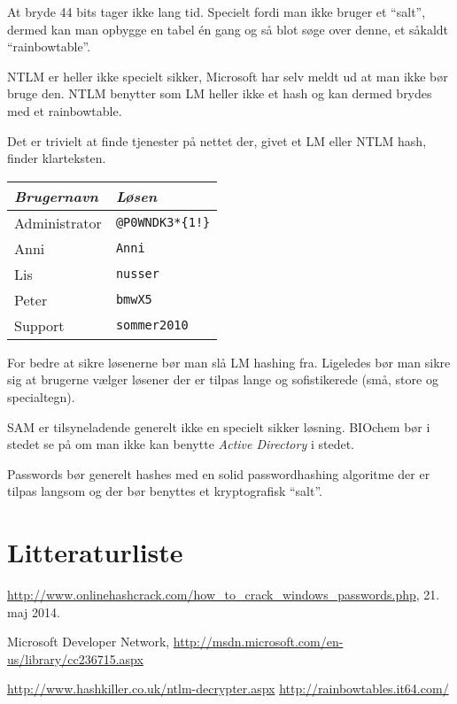 \documentclass[10pt,a4paper,danish]{article}
\begin{document}
At bryde 44 bits tager ikke lang tid.
Specielt fordi man ikke bruger et ``salt'', dermed kan man opbygge en tabel én
gang og så blot søge over denne, et såkaldt ``rainbowtable''.


NTLM er heller ikke specielt sikker, Microsoft har selv meldt ud at man ikke bør
bruge den. NTLM benytter som LM heller ikke et hash og kan dermed brydes med et
rainbowtable.

Det er trivielt at finde tjenester\cite{cracker1} \cite{cracker2} på nettet der, givet et LM eller NTLM hash, finder
klarteksten.

\begin{table}[h!]
  \centering
  \begin{tabular}{ll}
    \textit{Brugernavn} & \textit{Løsen} \\
    \hline
    Administrator & \texttt{@P0WNDK3*\{1!\}}\\
    Anni & \texttt{Anni}\\
    Lis & \texttt{nusser}\\
    Peter & \texttt{bmwX5}\\
    Support & \texttt{sommer2010}
  \end{tabular}
\end{table}

For bedre at sikre løsenerne bør man slå LM hashing fra. Ligeledes bør man sikre
sig at brugerne vælger løsener der er tilpas lange og sofistikerede (små, store
og specialtegn).

SAM er tilsyneladende generelt ikke en specielt sikker løsning. BIOchem bør i stedet se på om
man ikke kan benytte \textit{Active Directory} i stedet.

Passwords bør generelt hashes med en solid passwordhashing algoritme der er
tilpas langsom og der bør benyttes et kryptografisk ``salt''.

\section{Litteraturliste}

\begin{thebibliography}{9}

  \url{http://www.onlinehashcrack.com/how_to_crack_windows_passwords.php}, 21.
  maj 2014.

 Microsoft Developer Network,
  \url{http://msdn.microsoft.com/en-us/library/cc236715.aspx}

 \url{http://www.hashkiller.co.uk/ntlm-decrypter.aspx}
 \url{http://rainbowtables.it64.com/}

\end{thebibliography}
\end{document}
